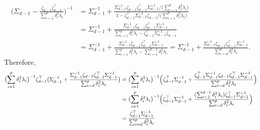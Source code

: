 \documentclass[10pt]{article}
\begin{document}
\begin{equation*}
\begin{split}
(\Sigma_{d-1} - \frac{\zeta_{d-1} \zeta_{d-1}^{\top}}{\sum_{i=1}^{p} \delta_i^{2} \lambda_i}\bigr)^{-1} &= \Sigma_{d-1}^{-1} + \frac{\Sigma_{d-1}^{-1} \zeta_{d-1} \zeta_{d-1}^{\top} \Sigma_{d-1}^{-1}/ \bigl(\sum_{i=1}^{p} \delta_i^{2} \lambda_i\bigr)}{1 - \zeta_{d-1}^{\top} \Sigma_{d-1}^{-1} \zeta_{d-1}/\bigl(\sum_{i=1}^{p} \delta_i^{2} \lambda_i\bigr)} \\
&= \Sigma_{d-1}^{-1} + \frac{\Sigma_{d-1}^{-1} \zeta_{d-1} \zeta_{d-1}^{\top} \Sigma_{d-1}^{-1}}{\sum_{i=1}^{p} \delta_i^{2} \lambda_i - \zeta_{d-1}^{\top} \Sigma_{d-1}^{-1} \zeta_{d-1}} \\
&= \Sigma_{d-1}^{-1} + \frac{\Sigma_{d-1}^{-1} \zeta_{d-1} \zeta_{d-1}^{\top} \Sigma_{d-1}^{-1}}{\sum_{i=1}^{p} \delta_i^{2} \lambda_i - \sum_{i=1}^{d-1} \delta_i^{2} \lambda_i} = \Sigma_{d-1}^{-1} + \frac{\Sigma_{d-1}^{-1} \zeta_{d-1} \zeta_{d-1}^{\top} \Sigma_{d-1}^{-1}}{\sum_{i=d}^{p} \delta_i^{2} \lambda_i}.
\end{split}
\end{equation*}
Therefore,
\begin{equation*}
\begin{split}
\bigl(\sum_{i=1}^{p} \delta_i^{2} \lambda_i\bigr)^{-1} \zeta_{d-1}^{\top} \bigl(\Sigma_{d-1}^{-1} + \frac{\Sigma_{d-1}^{-1} \zeta_{d-1} \zeta_{d-1}^{\top} \Sigma_{d-1}^{-1}}{\sum_{i=d}^{p} \delta_i^{2} \lambda_i} \bigr) &= \bigl(\sum_{i=1}^{p} \delta_i^{2} \lambda_i\bigr)^{-1} \Bigl(\zeta_{d-1}^{\top} \Sigma_{d-1}^{-1} + \frac{\zeta_{d-1}^{\top} \Sigma_{d-1}^{-1} \zeta_{d-1} \zeta_{d-1}^{\top} \Sigma_{d-1}^{-1}}{\sum_{i=d}^{p} \delta_i^{2} \lambda_i} \Bigr) \\
&= \bigl(\sum_{i=1}^{p} \delta_i^{2} \lambda_i\bigr)^{-1} \Bigl(\zeta_{d-1}^{\top} \Sigma_{d-1}^{-1} + \frac{(\sum_{i=1}^{d-1} \delta_i^{2} \lambda_i)
\zeta_{d-1}^{\top} \Sigma_{d-1}^{-1}}{\sum_{i=d}^{p} \delta_i^{2} \lambda_i}\Bigr) \\
& = \frac{\zeta_{d-1}^{\top} \Sigma_{d-1}^{-1}}{\sum_{i=d}^{p} \delta_i^{2} \lambda_i}
\end{split}
\end{equation*}
\end{document}
